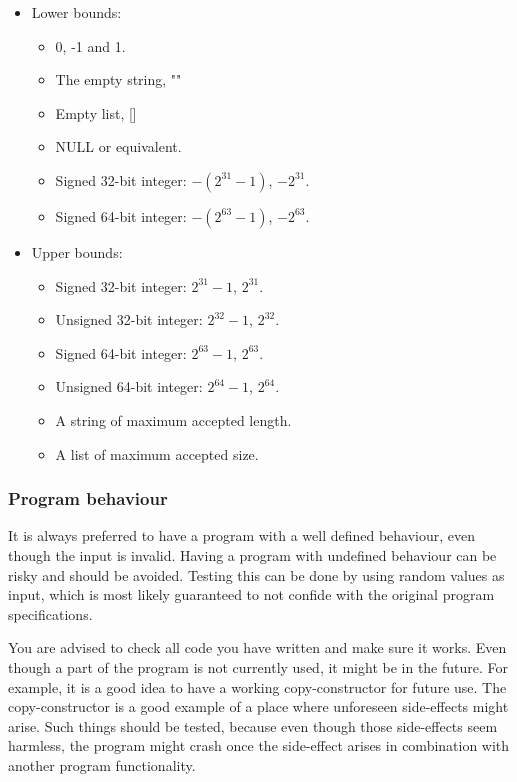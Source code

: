 \documentclass[11pt,a4paper,twoside]{article}
\begin{document}
\begin{itemize}
    \item Lower bounds:
    \begin{itemize}
        \item 0, -1 and 1.
        \item The empty string, ""
        \item Empty list, []
        \item NULL or equivalent.
        \item Signed 32-bit integer: $-(2^{31}-1)$, $-2^{31}$.
        \item Signed 64-bit integer: $-(2^{63}-1)$, $-2^{63}$.
    \end{itemize}
    \item Upper bounds:
    \begin {itemize}
        \item Signed 32-bit integer: $2^{31}-1$, $2^{31}$.
        \item Unsigned 32-bit integer: $2^{32}-1$, $2^{32}$.
        \item Signed 64-bit integer: $2^{63}-1$, $2^{63}$.
        \item Unsigned 64-bit integer: $2^{64}-1$, $2^{64}$.
        \item A string of maximum accepted length.
        \item A list of maximum accepted size.
    \end{itemize}
\end{itemize}

\subsubsection{Program behaviour}

It is always preferred to have a program with a well defined behaviour, even
though the input is invalid. Having a program with undefined behaviour can be
risky and should be avoided. Testing this can be done by using random values as
input, which is most likely guaranteed to not confide with the original program
specifications.

You are advised to check all code you have written and make sure it works. Even
though a part of the program is not currently used, it might be in the future.
For example, it is a good idea to have a working copy-constructor for future
use. The copy-constructor is a good example of a place where unforeseen
side-effects might arise. Such things should be tested, because even though
those side-effects seem harmless, the program might crash once the side-effect
arises in combination with another program functionality.
\end{document}
